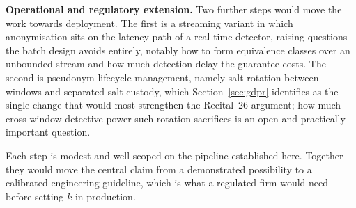 \documentclass[10pt,a4paper]{article}
\begin{document}
\noindent\textbf{Operational and regulatory extension.} Two further steps would move the work towards deployment. The first is a streaming variant in which anonymisation sits on the latency path of a real-time detector, raising questions the batch design avoids entirely, notably how to form equivalence classes over an unbounded stream and how much detection delay the guarantee costs. The second is pseudonym lifecycle management, namely salt rotation between windows and separated salt custody, which Section~\ref{sec:gdpr} identifies as the single change that would most strengthen the Recital~26 argument; how much cross-window detective power such rotation sacrifices is an open and practically important question.

\noindent Each step is modest and well-scoped on the pipeline established here. Together they would move the central claim from a demonstrated possibility to a calibrated engineering guideline, which is what a regulated firm would need before setting $k$ in production.
\end{document}
